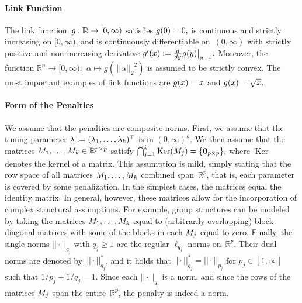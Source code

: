 \documentclass[bj]{imsart}
\newcommand{\normtwo}[1]{\ensuremath{\!|\!| #1 | \! |_{2}}}
\newcommand{\normqj}[1]{\ensuremath{\!|\!| #1 | \! |_{q_j}}}
\newcommand{\normqjd}[1]{\ensuremath{\!|\!| #1 | \! |_{q_j}^*}}
\newcommand{\normpj}[1]{\ensuremath{\!|\!| #1 | \! |_{p_j}}}
\newcommand{\1}{{\rm 1}\mskip -4,5mu{\rm l} }
\def\R{\mathbb{R}}
\begin{document}
\paragraph{Link Function} The link function~$\linkfunction:\R\to[0,\infty)$ satisfies $g(0)=0,$ is continuous and strictly increasing on $[0,\infty)$, and  is continuously differentiable on~$(0,\infty)$ with strictly positive and non-increasing derivative $g'(x):=\frac{d}{dy}g(y)\big\lvert_{y=x}.$ Moreover, the function $\R^n\to[0,\infty):$ $\alpha\mapsto g(\,\normtwo{\alpha}^2)$ is assumed to be strictly convex. The most important examples of link functions are $g(x)=x$ and $g(x)=\sqrt x.$
 

\paragraph{Form of the Penalties} We assume that the penalties are composite norms.  First, we assume that the tuning parameter $\lambda:=(\lambda_1,\dots,\lambda_k)^\top$ is in $(0,\infty)^k.$  We then assume that the matrices $\fusedmatrix_1,\dots,\fusedmatrix_\numbergroups\in\R^{p\times p}$ satisfy $\bigcap_{j=1}^{k} \operatorname{Ker}(M_j)=\{\mathbf 0_{p\times p}\},$ where $\operatorname{Ker}$ denotes the kernel of a matrix. This assumption is mild, simply stating that the row space of all matrices $M_1,\dots,M_{k}$ combined span~$\R^p$, that is, each parameter is covered by some penalization.  In the simplest cases, the matrices  equal the identity matrix. In general, however, these matrices allow for the incorporation of complex structural assumptions. For example, group structures can be modeled by taking the matrices $M_1,\dots,M_{k}$ equal to (arbitrarily overlapping) block-diagonal matrices with some of the blocks in each $M_j$ equal to zero. Finally, the single norms $\normqj{\cdot}$ with $q_j\geq 1$ are the regular $\ell_{q_j}$-norms on~$\R^{p}.$ Their dual norms are denoted by~$\normqjd{\cdot}$, and it holds that $\normqjd{\cdot}=\normpj{\cdot}$ for $p_j\in[1,\infty]$ such that ${1}/{p_j} + {1}/{q_j} =1.$ Since each $\normqj{\cdot}$ is a norm, and since the rows of the matrices $M_j$ span the entire~$\R^p$, the penalty is indeed a norm.

\end{document}
